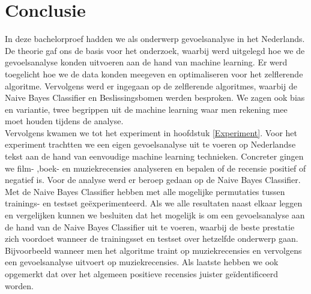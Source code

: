 \chapter{Conclusie}\label{Conclusie}

In deze bachelorproef hadden we als onderwerp gevoelsanalyse in het Nederlands. De theorie gaf ons de basis voor het onderzoek, waarbij werd uitgelegd hoe we de gevoelsanalyse konden uitvoeren aan de hand van machine learning. Er werd toegelicht hoe we de data konden meegeven en optimaliseren voor het zelflerende algoritme. Vervolgens werd er ingegaan op de zelflerende algoritmes, waarbij de  Naive Bayes Classifier en Beslissingsbomen werden besproken. We zagen ook bias en variantie, twee begrippen uit de machine learning waar men rekening mee moet houden tijdens de analyse.\\
Vervolgens kwamen we tot het experiment in hoofdstuk \ref{Experiment}. Voor het experiment trachtten we een eigen gevoelsanalyse uit te voeren op Nederlandse tekst aan de hand van eenvoudige machine learning technieken. Concreter gingen we film- ,boek- en muziekrecensies analyseren en bepalen of de recensie positief of negatief is. Voor de analyse werd er beroep gedaan op de Naive Bayes Classifier. Met de Naive Bayes Classifier hebben met alle mogelijke permutaties tussen trainings- en testset ge\"experimenteerd. Als we alle resultaten naast elkaar leggen en vergelijken kunnen we besluiten dat het mogelijk is om een gevoelsanalyse aan de hand van de Naive Bayes Classifier uit te voeren, waarbij de beste prestatie zich voordoet wanneer de trainingsset en testset over hetzelfde onderwerp gaan. Bijvoorbeeld wanneer men het algoritme traint op muziekrecensies en vervolgens een gevoelsanalyse uitvoert op muziekrecensies. Als laatste hebben we ook opgemerkt dat over het algemeen positieve recensies juister ge\"identificeerd worden.
